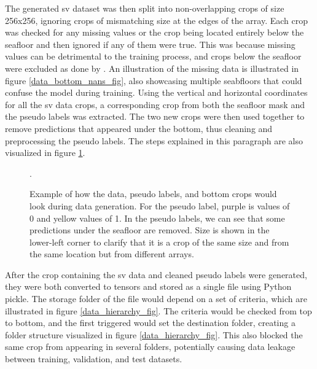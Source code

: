         
        The generated \gls{sv} dataset was then split into non-overlapping crops of size 256x256, ignoring crops of mismatching size at the edges of the array. Each crop was checked for any missing values or the crop being located entirely below the seafloor and then ignored if any of them were true. This was because missing values can be detrimental to the training process, and crops below the seafloor were excluded as done by \citeauthor{brautaset2020acoustic}\cite{brautaset2020acoustic}. An illustration of the missing data is illustrated in figure \ref{data_bottom_nans_fig}, also showcasing multiple seabfloors that could confuse the model during training. Using the vertical and horizontal coordinates for all the \gls{sv} data crops, a corresponding crop from both the seafloor mask and the pseudo labels was extracted. The two new crops were then used together to remove predictions that appeared under the bottom, thus cleaning and preprocessing the pseudo labels. The steps explained in this paragraph are also visualized in figure \ref{crop_extract_fig}.
        \begin{figure}[H]
            \centering
            
            \caption[Data, label and bottom crop extraction and interaction]{Example of how the data, pseudo labels, and bottom crops would look during data generation. For the pseudo label, purple is values of 0 and yellow values of 1. In the pseudo labels, we can see that some predictions under the seafloor are removed.  Size is shown in the lower-left corner to clarify that it is a crop of the same size and from the same location but from different arrays.}.
          	\medskip 
            \label{crop_extract_fig}
        \end{figure}
        
        After the crop containing the \gls{sv} data and cleaned pseudo labels were generated, they were both converted to tensors and stored as a single file using Python pickle. The storage folder of the file would depend on a set of criteria, which are illustrated in figure \ref{data_hierarchy_fig}. The criteria would be checked from top to bottom, and the first triggered would set the destination folder, creating a folder structure visualized in figure \ref{data_hierarchy_fig}. This also blocked the same crop from appearing in several folders, potentially causing data leakage between training, validation, and test datasets.
        
